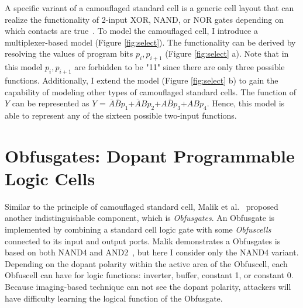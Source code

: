 \documentclass[thesis]{umassthesis}  %
\begin{document}
A specific variant of a camouflaged standard cell is a generic cell layout that can realize the functionality of 2-input XOR, NAND, or NOR gates depending on which contacts are true~\cite{rajendran-13}. To model the camouflaged cell, I introduce a multiplexer-based model (Figure \ref{fig:select}). The functionality can be derived by resolving the values of program bits $p_{i},p_{i+1}$ (Figure \ref{fig:select} a). Note that in this model $p_{i},p_{i+1}$ are forbidden to be "11" since there are only three possible functions. Additionally, I extend the model (Figure \ref{fig:select} b) to gain the capability of modeling other types of camouflaged standard cells. The function of $Y$ can be represented as $Y$ = $\bar{A}\bar{B}p_{1}$+$\bar{A}Bp_{2}$+$A\bar{B}p_{3}$+$ABp_{4}$. Hence, this model is able to represent any of the sixteen possible two-input functions. 


















\section{Obfusgates: Dopant Programmable Logic Cells}

Similar to the principle of camouflaged standard cell, Malik et al.~\cite{malik-obfusgate} proposed another indistinguishable component, which is \textit{Obfusgates}. An Obfusgate is implemented by combining a standard cell logic gate with some \textit{Obfuscells} connected to its input and output ports. Malik demonstrates a Obfusgates is based on both NAND4 and AND2~\cite{malik-obfusgate}, but here I consider only the NAND4 variant. Depending on the dopant polarity within the active area of the Obfuscell, each Obfuscell can have for logic functions: inverter, buffer, constant 1, or constant 0. Because imaging-based technique can not see the dopant polarity, attackers will have difficulty learning the logical function of the Obfusgate.
\end{document}
